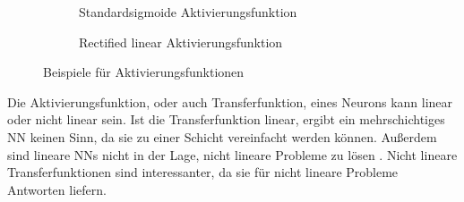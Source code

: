 \begin{figure}
  \centering
  \begin{subfigure}{.5\textwidth}
    \centering
    \caption{Standardsigmoide Aktivierungsfunktion}
    \label{fig:sigmoid}
  \end{subfigure}%
  \begin{subfigure}{.5\textwidth}
    \centering
    \caption{Rectified linear Aktivierungsfunktion}
    \label{fig:Relu}
  \end{subfigure}
  \caption{Beispiele für Aktivierungsfunktionen}
  \label{fig:activationfunction}
\end{figure}

Die Aktivierungsfunktion, oder auch Transferfunktion, eines Neurons kann linear oder nicht linear sein. Ist die Transferfunktion linear, ergibt ein mehrschichtiges \ac{NN} keinen Sinn, da sie zu einer Schicht vereinfacht werden können. Außerdem sind lineare \acp{NN} nicht in der Lage, nicht lineare Probleme zu lösen \cite{minsky1969perceptron}. Nicht lineare Transferfunktionen sind interessanter, da sie für nicht lineare Probleme Antworten liefern.

